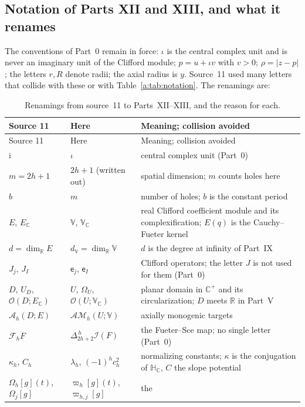 \documentclass[11pt,a4paper]{article}
\numberwithin{equation}{section}
\theoremstyle{definition}
\theoremstyle{remark}
\theoremstyle{plain}
\newcommand{\HC}{\mathbb H_{\mathbb C}}
\newcommand{\RR}{\mathbb R}
\newcommand{\CC}{\mathbb C}
\newcommand{\Cplus}{\CC^{+}}
\newcommand{\I}{\mathcal I}
\newcommand{\AM}{\mathcal{AM}}
\newcommand{\Om}{\Omega}
\newcommand{\abs}[1]{\lvert #1\rvert}
\newcommand{\lapH}{\Delta_{2h+2}^{\,h}}
\newcommand{\VV}{\mathbb V}                       %
\newcommand{\VC}{\mathbb V_{\CC}}                 %
\newcommand{\dV}{d_{\VV}}                         %
\newcommand{\cur}{\varpi}                         %
\begin{document}
\subsection{Notation of Parts XII and XIII, and what it renames}
\label{g:sub:notation}

The conventions of Part~0 remain in force: $\iota$ is the central complex
unit and is never an imaginary unit of the Clifford module; $p=u+\iota v$
with $v>0$; $\rho=\abs{z-p}$; the letters $r,R$ denote radii; the axial
radius is $y$. Source~11 used many letters that collide with these or with
Table~\ref{a:tab:notation}. The renamings are:

{\small
\renewcommand{\arraystretch}{1.22}
\begin{longtable}{@{}p{}p{}p{}@{}}
\caption{Renamings from source~11 to Parts~XII--XIII, and the reason for
each.}
\label{g:tab:notation}\\
\toprule
Source 11 & Here & Meaning; collision avoided\\
\midrule
\endfirsthead
\toprule
Source 11 & Here & Meaning; collision avoided\\
\midrule
\endhead
$\mathrm i$ & $\iota$ & central complex unit (Part~0)\\
$m=2h+1$ & $2h+1$ (written out) & spatial dimension; $m$ counts holes here\\
$b$ & $m$ & number of holes; $b$ is the constant period\\
$E$, $E_{\CC}$ & $\VV$, $\VC$ & real Clifford coefficient module and its
 complexification; $E(q)$ is the Cauchy--Fueter kernel\\
$d=\dim_{\RR}E$ & $\dV=\dim_\RR\VV$ & $d$ is the degree at infinity of
 Part~IX\\
$J_j$, $J_I$ & $\mathsf e_j$, $\mathsf e_I$ & Clifford operators; the letter
 $J$ is not used for them (Part~0)\\
$D$, $U_D$, $\mathcal O(D;E_\CC)$ & $U$, $\Om_U$, $\mathcal O(U;\VC)$ & planar
 domain in $\Cplus$ and its circularization; $D$ meets $\RR$ in Part~V\\
$\mathcal A_h(D;E)$ & $\AM_h(U;\VV)$ & axially monogenic targets\\
$\mathcal F_hF$ & $\lapH\I(F)$ & the Fueter--Sce map; no single letter
 (Part~0)\\
$\kappa_h$, $C_h$ & $\lambda_h$, $(-1)^hc_h^2$ & normalizing constants;
 $\kappa$ is the conjugation of $\HC$, $C$ the slope potential\\
$\Omega_h[g](t)$, $\Omega_j[g]$ & $\cur_h[g](t)$, $\cur_{h,j}[g]$ & the

\end{longtable}}
\end{document}

